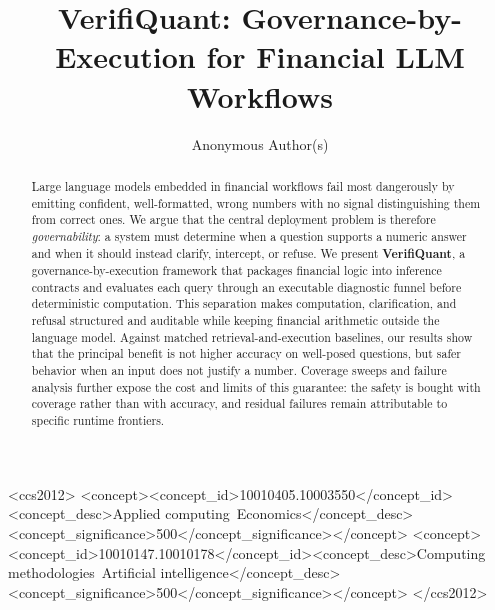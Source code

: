 \documentclass[sigconf,anonymous]{acmart}
\begin{document}
\title{VerifiQuant: Governance-by-Execution for Financial LLM Workflows}

\author{Anonymous Author(s)}

\begin{abstract}
Large language models embedded in financial workflows fail most dangerously by emitting confident, well-formatted, wrong numbers with no signal distinguishing them from correct ones.
We argue that the central deployment problem is therefore \emph{governability}: a system must determine when a question supports a numeric answer and when it should instead clarify, intercept, or refuse.
We present \textbf{VerifiQuant}, a governance-by-execution framework that packages financial logic into inference contracts and evaluates each query through an executable diagnostic funnel before deterministic computation.
This separation makes computation, clarification, and refusal structured and auditable while keeping financial arithmetic outside the language model.
Against matched retrieval-and-execution baselines, our results show that the principal benefit is not higher accuracy on well-posed questions, but safer behavior when an input does not justify a number.
Coverage sweeps and failure analysis further expose the cost and limits of this guarantee: the safety is bought with coverage rather than with accuracy, and residual failures remain attributable to specific runtime frontiers.
\end{abstract}

\begin{CCSXML}
<ccs2012>
<concept><concept_id>10010405.10003550</concept_id><concept_desc>Applied computing~Economics</concept_desc><concept_significance>500</concept_significance></concept>
<concept><concept_id>10010147.10010178</concept_id><concept_desc>Computing methodologies~Artificial intelligence</concept_desc><concept_significance>500</concept_significance></concept>
</ccs2012>
\end{CCSXML}

\maketitle

\setlength{\abovedisplayskip}{5pt plus 2pt minus 2pt}
\setlength{\belowdisplayskip}{5pt plus 2pt minus 2pt}
\setlength{\abovedisplayshortskip}{2pt plus 2pt}
\setlength{\belowdisplayshortskip}{4pt plus 2pt minus 2pt}
\end{document}

